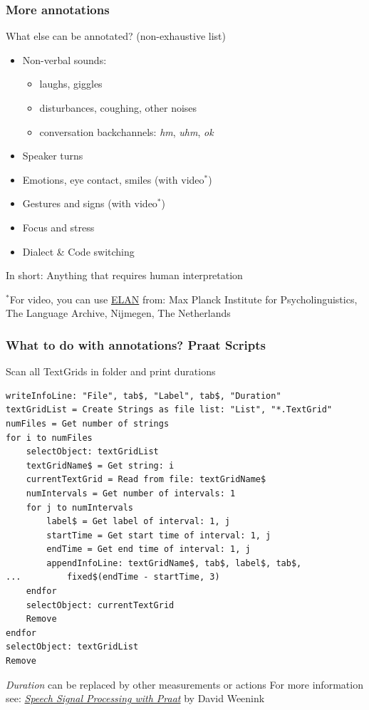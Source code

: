 \documentclass{beamer}
\begin{document}
\begin{frame} 
\frametitle{More annotations} 
\begin{block}{What else can be annotated? (non-exhaustive list)}
\begin{itemize} 
\item Non-verbal sounds:
\begin{itemize}
\item laughs, giggles
\item disturbances, coughing, other noises
\item conversation backchannels: \textit{hm},  \textit{uhm}, \textit{ok}
\end{itemize}
\item Speaker turns
\item Emotions, eye contact, smiles (with video$^*$)
\item Gestures and signs  (with video$^*$)
\item Focus and stress
\item Dialect \& Code switching
\end{itemize}
\end{block} 
In short: Anything that requires human interpretation

\vskip 0.5cm
$^*$\scriptsize{For video, you can use \href{https://tla.mpi.nl/tools/tla-tools/elan/}{ELAN} from: Max Planck Institute for Psycholinguistics, The Language Archive, Nijmegen, The Netherlands}

\end{frame}

\begin{frame} [fragile]
\frametitle{What to do with annotations? Praat Scripts} 
\vskip -0.5cm
\begin{block}{Scan all TextGrids in folder and print durations}
\begin{tiny}
\begin{verbatim}
writeInfoLine: "File", tab$, "Label", tab$, "Duration"
textGridList = Create Strings as file list: "List", "*.TextGrid"
numFiles = Get number of strings
for i to numFiles
    selectObject: textGridList
    textGridName$ = Get string: i
    currentTextGrid = Read from file: textGridName$
    numIntervals = Get number of intervals: 1
    for j to numIntervals
        label$ = Get label of interval: 1, j
        startTime = Get start time of interval: 1, j
        endTime = Get end time of interval: 1, j
        appendInfoLine: textGridName$, tab$, label$, tab$, 
...         fixed$(endTime - startTime, 3) 
    endfor
    selectObject: currentTextGrid
    Remove
endfor
selectObject: textGridList
Remove
\end{verbatim}
\end{tiny}

\end{block}
\textit{Duration} can be replaced by other measurements or actions
\vskip 0.2cm
\scriptsize{For more information see: \textit{\href{http://www.fon.hum.uva.nl/david/LOT/sspbook.pdf}{Speech Signal Processing with Praat}}
by David Weenink}
\end{frame}
\end{document}
